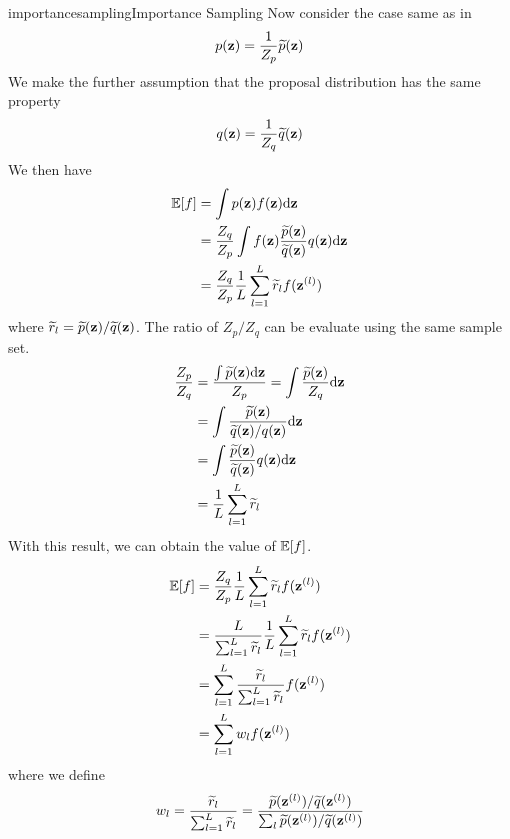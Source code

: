 \documentclass[9pt]{article}
\begin{document}
\begin{topic}{importancesampling}{Importance Sampling}
Now consider the case same as in 
\[
p(\mathbf{z}) = \frac{1}{Z_p}\widetilde{p}(\mathbf{z})
\]
We make the further assumption that the proposal distribution has the same property
\[
q(\mathbf{z}) = \frac{1}{Z_q}\widetilde{q}(\mathbf{z})
\]
We then have
\[
\begin{split}
\operatorname{\mathbb{E}}[f] &= \int p(\mathbf{z})f(\mathbf{z})\mathrm{d}\mathbf{z}\\
&= \frac{Z_q}{Z_p}\int f(\mathbf{z}) \frac{\widetilde{p}(\mathbf{z})}{\widetilde{q}(\mathbf{z})} q(\mathbf{z}) \mathrm{d}\mathbf{z}\\
&= \frac{Z_q}{Z_p}\frac{1}{L} \sum_{l=1}^{L}\widetilde{r}_l f(\mathbf{z}^{(l)})
\end{split}
\]
where $\widetilde{r}_l = \widetilde{p}(\mathbf{z})/\widetilde{q}(\mathbf{z})$. The ratio of $Z_p/Z_q$ can be evaluate using the same sample set.
\[
\begin{split}
\frac{Z_p}{Z_q} &= \frac{\int \widetilde{p}(\mathbf{z}) \mathrm{d} \mathbf{z}}{Z_p} = \int \frac{\widetilde{p}(\mathbf{z})}{Z_q} \mathrm{d}\mathbf{z}\\
&= \int \frac{\widetilde{p}(\mathbf{z})}{\widetilde{q}(\mathbf{z})/q(\mathbf{z})} \mathrm{d}\mathbf{z}\\
&= \int \frac{\widetilde{p}(\mathbf{z})}{\widetilde{q}(\mathbf{z})} q(\mathbf{z})\mathrm{d}\mathbf{z}\\
&= \frac{1}{L} \sum_{l=1}^{L}\widetilde{r}_l
\end{split}
\]
With this result, we can obtain the value of $\operatorname{\mathbb{E}}[f]$.
\[
\begin{split}
\operatorname{\mathbb{E}}[f] &= \frac{Z_q}{Z_p}\frac{1}{L} \sum_{l=1}^{L}\widetilde{r}_l f(\mathbf{z}^{(l)})\\
&= \frac{L}{\sum_{l=1}^{L}\widetilde{r}_l}\frac{1}{L} \sum_{l=1}^{L}\widetilde{r}_l f(\mathbf{z}^{(l)})\\
&=\sum_{l=1}^{L}\frac{\widetilde{r}_l}{\sum_{l=1}^{L}\widetilde{r}_l} f(\mathbf{z}^{(l)})\\
&=\sum_{l=1}^{L}w_l f(\mathbf{z}^{(l)})
\end{split}
\]
where we define
\[
w_l = \frac{\widetilde{r}_l}{\sum_{l=1}^{L}\widetilde{r}_l} = \frac{\widetilde{p}(\mathbf{z}^{(l)})/\widetilde{q}(\mathbf{z}^{(l)})}{\sum_{l} \widetilde{p}(\mathbf{z}^{(l)})/\widetilde{q}(\mathbf{z}^{(l)})}
\]

\end{topic}
\end{document}

